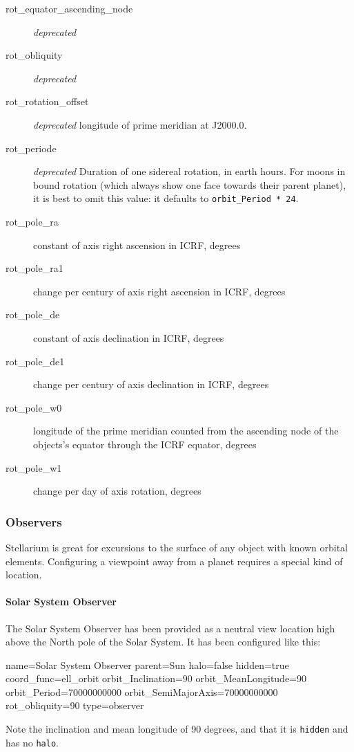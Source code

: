 \begin{description}
  \item[rot\_equator\_ascending\_node] \emph{deprecated}
  \item[rot\_obliquity] \emph{deprecated}
  \item[rot\_rotation\_offset] \emph{deprecated} longitude of prime meridian at J2000.0. 
  \item[rot\_periode]  \emph{deprecated}  Duration of one sidereal rotation, in earth hours. For moons in bound rotation 
       (which always show one face towards their parent planet), it is best to omit this value: it defaults to \texttt{orbit\_Period * 24}. 

  \item[rot\_pole\_ra]  constant of axis right ascension in ICRF, degrees
  \item[rot\_pole\_ra1] change per century of axis right ascension in ICRF, degrees
  \item[rot\_pole\_de] constant of axis declination in ICRF, degrees
  \item[rot\_pole\_de1] change per century of axis declination in ICRF, degrees
  \item[rot\_pole\_w0] longitude of the prime meridian counted from the
    ascending node of the objects's equator through the ICRF equator, degrees
  \item[rot\_pole\_w1] change per day of axis rotation, degrees  
\end{description}



\subsubsection{Observers}
\label{sec:ssystem.ini:Observers}

Stellarium is great for excursions to the surface of any object with
known orbital elements.  Configuring a viewpoint away from a planet
requires a special kind of location.

\paragraph{Solar System Observer}
\label{sec:ssystem.ini:SolarSystemObserver}

The Solar System Observer has
been provided as a neutral view location high above the North pole of
the Solar System. It has been configured like this:
\begin{configfile}
name=Solar System Observer
parent=Sun
halo=false
hidden=true
coord_func=ell_orbit
orbit_Inclination=90
orbit_MeanLongitude=90
orbit_Period=70000000000
orbit_SemiMajorAxis=70000000000
rot_obliquity=90
type=observer
\end{configfile}
Note the inclination and mean longitude of 90 degrees, and that it is \texttt{hidden} and has no \texttt{halo}. 

